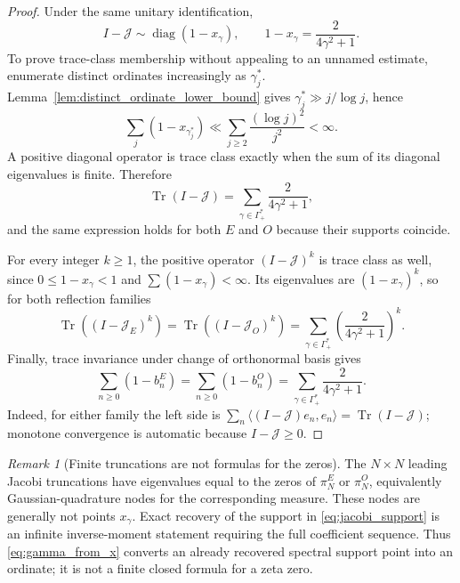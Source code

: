 \documentclass[11pt]{amsart}
\numberwithin{equation}{section}
\theoremstyle{plain}
\theoremstyle{definition}
\theoremstyle{remark}
\newtheorem{remark}[theorem]{Remark}
\begin{document}
\begin{proof}
Under the same unitary identification,
\begin{equation}
I-\mathcal J\sim\operatorname{diag}(1-x_\gamma),
\qquad
1-x_\gamma=\frac{2}{4\gamma^2+1}.
\label{eq:one_minus_xgamma}
\end{equation}
To prove trace-class membership without appealing to an unnamed estimate, enumerate distinct ordinates increasingly as $\gamma_j^*$.  Lemma~\ref{lem:distinct_ordinate_lower_bound} gives
$\gamma_j^*\gg j/\log j$, hence
\begin{equation}
\sum_j(1-x_{\gamma_j^*})
\ll\sum_{j\ge2}\frac{(\log j)^2}{j^2}<\infty.
\end{equation}
A positive diagonal operator is trace class exactly when the sum of its diagonal eigenvalues is finite.  Therefore
\begin{equation}
\operatorname{Tr}(I-\mathcal J)
=\sum_{\gamma\in\Gamma_+^*}\frac{2}{4\gamma^2+1},
\label{eq:Jacobi_trace_formula}
\end{equation}
and the same expression holds for both $E$ and $O$ because their supports coincide.

For every integer $k\ge1$, the positive operator $(I-\mathcal J)^k$ is trace class as well, since
$0\le1-x_\gamma<1$ and $\sum(1-x_\gamma)<\infty$.  Its eigenvalues are $(1-x_\gamma)^k$, so for both reflection families
\begin{equation}
\operatorname{Tr}\!\left((I-\mathcal J_E)^k\right)
=\operatorname{Tr}\!\left((I-\mathcal J_O)^k\right)
=\sum_{\gamma\in\Gamma_+^*}\left(\frac{2}{4\gamma^2+1}\right)^k.
\label{eq:Jacobi_trace_powers}
\end{equation}
Finally, trace invariance under change of orthonormal basis gives
\begin{equation}
\sum_{n\ge0}(1-b_n^E)
=\sum_{n\ge0}(1-b_n^O)
=\sum_{\gamma\in\Gamma_+^*}\frac{2}{4\gamma^2+1}.
\label{eq:Jacobi_diagonal_trace}
\end{equation}
Indeed, for either family the left side is $\sum_n\langle(I-\mathcal J)e_n,e_n\rangle=\operatorname{Tr}(I-\mathcal J)$; monotone convergence is automatic because $I-\mathcal J\ge0$.
\end{proof}

\begin{remark}[Finite truncations are not formulas for the zeros]
\label{rem:finite_jacobi_not_zeros}
The $N\times N$ leading Jacobi truncations have eigenvalues equal to the zeros of $\pi_N^E$ or $\pi_N^O$, equivalently Gaussian-quadrature nodes for the corresponding measure. These nodes are generally not points $x_\gamma$. Exact recovery of the support in \eqref{eq:jacobi_support} is an infinite inverse-moment statement requiring the full coefficient sequence. Thus \eqref{eq:gamma_from_x} converts an already recovered spectral support point into an ordinate; it is not a finite closed formula for a zeta zero.
\end{remark}
\end{document}
